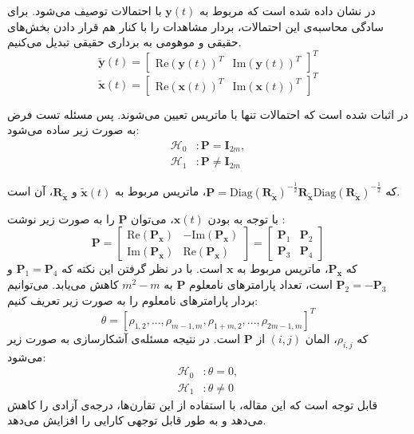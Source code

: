 در  نشان داده شده است که  مربوط به
$\mathbf{y}(t)$
با احتمالات  توصیف می‌شود. برای سادگی محاسبه‌ی این احتمالات، بردار مشاهدات را با کنار هم قرار دادن بخش‌های حقیقی و موهومی به برداری حقیقی تبدیل می‌کنیم.
\begin{equation}
	\tilde{\mathbf{y}}(t)=\begin{bmatrix}
		\mathrm{Re}(\mathbf{y}(t))^T & \mathrm{Im}(\mathbf{y}(t))^T
	\end{bmatrix}^T
\end{equation}
\begin{equation}
	\tilde{\mathbf{x}}(t)=\begin{bmatrix}
		\mathrm{Re}(\mathbf{x}(t))^T & \mathrm{Im}(\mathbf{x}(t))^T
	\end{bmatrix}^T
\end{equation}

در  اثبات شده است که احتمالات  تنها با ماتریس  تعیین می‌شوند. پس مسئله تست فرض به صورت زیر ساده می‌شود:
\begin{align}
	\mathcal{H}_0 &: \mathbf{P}=\mathbf{I}_{2m}, \\
	\mathcal{H}_1 &: \mathbf{P}\neq\mathbf{I}_{2m}
\end{align}

که 
$\mathbf{P}=\mathrm{Diag}(\mathbf{R}_{\tilde{\mathbf{x}}})^{-\frac{1}{2}}\mathbf{R}_{\tilde{\mathbf{x}}}\mathrm{Diag}(\mathbf{R}_{\tilde{\mathbf{x}}})^{-\frac{1}{2}}$،
ماتریس  مربوط به 
$\tilde{\mathbf{x}}(t)$
 و 
$\mathbf{R}_{\tilde{\mathbf{x}}}$،
 آن است.

با توجه به  بودن 
$\mathbf{x}(t)$،
می‌توان 
$\mathbf{P}$
را به صورت زیر نوشت :
\begin{equation}
	\mathbf{P}=\begin{bmatrix}
		\mathrm{Re}(\mathbf{P}_\mathbf{x}) & -\mathrm{Im}(\mathbf{P}_\mathbf{x}) \\
		\mathrm{Im}(\mathbf{P}_\mathbf{x}) & \mathrm{Re}(\mathbf{P}_\mathbf{x})
	\end{bmatrix}=\begin{bmatrix}
	\mathbf{P}_1 & \mathbf{P}_2 \\
	\mathbf{P}_3 & \mathbf{P}_4
	\end{bmatrix} \label{eq:P}
\end{equation}
که 
$\mathbf{P}_\mathbf{x}$،
ماتریس  مربوط به 
$\mathbf{x}$
است. با در نظر گرفتن این نکته که 
$\mathbf{P}_1=\mathbf{P}_4$
و
$\mathbf{P}_2=-\mathbf{P}_3$
است، تعداد پارامترهای نامعلوم 
$\mathbf{P}$
به 
$m^2-m$
کاهش می‌یابد.
می‌توانیم بردار پارامترهای نامعلوم را به صورت زیر تعریف کنیم:
\begin{equation}
	\theta=[\rho_{1,2}, ..., \rho_{m-1,m}, \rho_{1+m, 2}, ..., \rho_{2m-1, m}]^T
\end{equation}
که 
$\rho_{i, j}$،
المان 
$(i, j)$
از 
$\mathbf{P}$
است.
در نتیجه مسئله‌ی آشکارسازی به صورت زیر می‌شود:
\begin{align}
	\mathcal{H}_0 &: \theta=0, \\
	\mathcal{H}_1 &: \theta\neq0
\end{align}
قابل توجه است که این مقاله، با استفاده از این تقارن‌ها، درجه‌ی آزادی را کاهش می‌دهد و به طور قابل توجهی کارایی  را افزایش می‌دهد.

